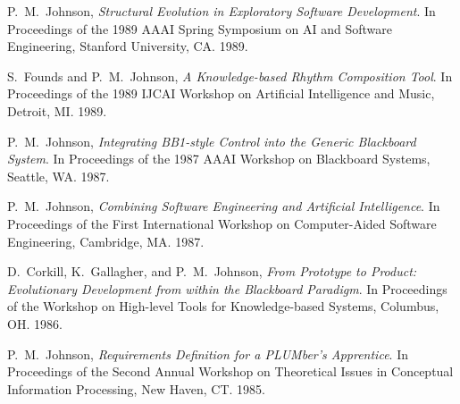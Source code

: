 \begin{Workshop Publications}
\item P.~M.~Johnson, 
     {\em Structural Evolution in Exploratory Software Development}.
     In Proceedings of the 1989 AAAI Spring Symposium on AI and Software
     Engineering, Stanford University, CA.
     1989.

\item S.~Founds and P.~M.~Johnson, 
     {\em A Knowledge-based Rhythm Composition Tool}.
     In Proceedings of the 1989 IJCAI Workshop on Artificial Intelligence
     and Music, Detroit, MI. 1989.


\item P.~M.~Johnson, 
     {\em Integrating BB1-style Control into the Generic Blackboard System}.
     In Proceedings of the 1987 AAAI Workshop on Blackboard Systems,
     Seattle, WA.
     1987.
     

\item P.~M.~Johnson, 
     {\em Combining Software Engineering and Artificial Intelligence}.
     In Proceedings of the First International Workshop on Computer-Aided
     Software Engineering, Cambridge, MA.
     1987.

\item D.~Corkill, K.~Gallagher, and P.~M.~Johnson, 
     {\em From Prototype to Product: Evolutionary Development from within
     the Blackboard Paradigm}.
     In Proceedings of the Workshop on High-level Tools for Knowledge-based
     Systems, Columbus, OH. 1986.

\item P.~M.~Johnson, 
     {\em Requirements Definition for a PLUMber's Apprentice}.
     In Proceedings of the Second Annual Workshop on Theoretical Issues in
     Conceptual Information Processing, New Haven, CT.  1985. 


\end{Workshop Publications}







